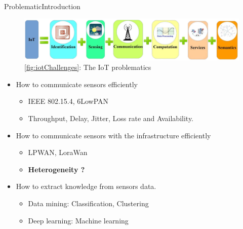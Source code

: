 \begin{frame}[noframenumbering]{Problematic}{Introduction}

\begin{figure}
	\includegraphics[width=.7\columnwidth]{res/iotChallenges.png}
	\caption*{ \ref{fig:iotChallenges}: The IoT problematics}
\end{figure}

\begin{itemize}
	\item How to communicate sensors efficiently
		\begin{itemize}
			\item IEEE 802.15.4, 6LowPAN
			\item Throughput, Delay, Jitter, Loss rate and Availability.
		\end{itemize}
	\item How to communicate sensors with the infrastructure efficiently
		\begin{itemize}
			\item LPWAN, LoraWan
			\item \textbf{Heterogeneity ?}
		\end{itemize}
	\item How to extract knowledge from sensors data.
		\begin{itemize}
			\item Data mining: Classification, Clustering
			\item Deep learning: Machine learning
		\end{itemize}
\end{itemize}
	
\end{frame}
